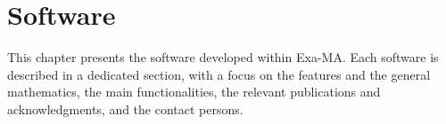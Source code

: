 \clearpage
\chapter{Software}
\label{sec:software}
This chapter presents the software developed within Exa-MA. Each software is described in a dedicated section, with a focus on the features and the general mathematics, the main functionalities, the relevant publications and acknowledgments, and the contact persons.
















